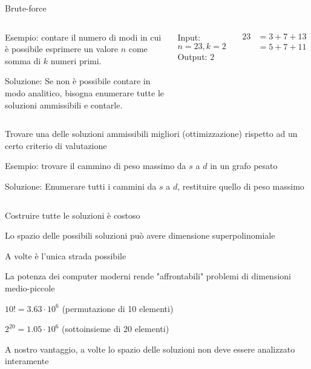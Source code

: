 \begin{frame}{Brute-force}
\begin{overprint}
\begin{columns}[T]
\begin{myboxtitle}[Conteggio]
\medskip
\alert{Esempio}: contare il numero di modi in cui è possibile esprimere un
valore $n$ come somma di $k$ numeri primi.

\medskip
\alert{Soluzione}: Se non è possibile contare in modo analitico, bisogna enumerare tutte le soluzioni ammissibili e contarle.
\end{myboxtitle}

\bigskip
\bigskip
\alert{Input}: $n=23, k=2$\\
\alert{Output}: $2$

\begin{align*}
  23 &= 3+7+13\\
     &= 5+7+11
\end{align*}
\end{columns}
\begin{columns}[T]
\begin{myboxtitle}[Ottimizzazione]
Trovare una delle soluzioni ammissibili migliori (\alert{ottimizzazione}) rispetto ad un certo criterio di valutazione

\medskip
\alert{Esempio}: trovare il cammino di peso massimo da $s$ a $d$
in un grafo pesato

\medskip
\alert{Soluzione}: Enumerare tutti i cammini da $s$ a $d$, restituire quello
di peso massimo
\end{myboxtitle}
\scalebox{0.67}{

}
\end{columns}

\end{overprint}

\end{frame}


\begin{frame}{Costruire tutte le soluzioni è costoso}
\BIL
\item Lo spazio delle possibili soluzioni può avere dimensione superpolinomiale
\item A volte è l'unica strada possibile
\item La potenza dei computer moderni rende "affrontabili" problemi di dimensioni medio-piccole
\BI
\item $10!	= 3.63 \cdot 10^6$	(permutazione di 10 elementi)
\item $2^{20} = 1.05 \cdot 10^6$ (sottoinsieme di 20 elementi)
\EI
\item A nostro vantaggio, a volte lo spazio delle soluzioni non deve essere analizzato interamente
\EIL
\end{frame}


